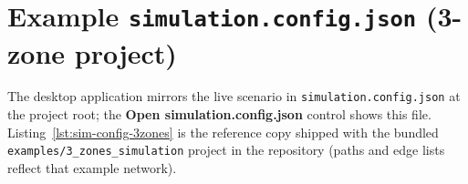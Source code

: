 \chapter{Example \texttt{simulation.config.json} (3-zone project)}
\label{ap:sim-config}

The desktop application mirrors the live scenario in \texttt{simulation.config.json} at the project root; the \textbf{Open simulation.config.json} control shows this file. Listing~\ref{lst:sim-config-3zones} is the reference copy shipped with the bundled \texttt{examples/3\_zones\_simulation} project in the repository (paths and edge lists reflect that example network).


